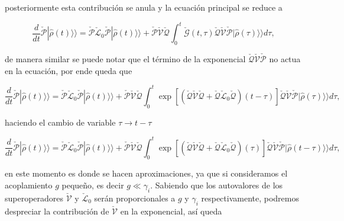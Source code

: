 \begin{appendixs}
posteriormente esta contribución se anula y la ecuación principal se reduce a

\begin{equation*}
    \frac{d}{dt}\check{\mathcal{P}}|\hat{\rho}(t)\rangle \rangle = \check{\mathcal{P}}\check{\mathcal{L}}_{0}\check{\mathcal{P}}|\hat{\rho}(t)\rangle \rangle + \check{\mathcal{P}}\check{\mathcal{V}}\check{\mathcal{Q}}\int_{0}^{t}\check{\mathcal{G}}(t,\tau)\check{\mathcal{Q}}\check{\mathcal{V}} \check{\mathcal{P}}|\hat{\rho}(\tau)\rangle \rangle d\tau,        
\end{equation*}

de manera similar se puede notar que el término de la exponencial $\check{\mathcal{Q}}\check{\mathcal{V}}\check{\mathcal{P}}$ no actua en la ecuación, por ende queda que 

\begin{equation*}
    \frac{d}{dt}\check{\mathcal{P}}|\hat{\rho}(t)\rangle \rangle  = \check{\mathcal{P}}\check{\mathcal{L}}_{0}\check{\mathcal{P}}|\hat{\rho}(t)\rangle \rangle  + \check{\mathcal{P}}\check{\mathcal{V}}\check{\mathcal{Q}}\int_{0}^{t}\exp \left[\left(\check{\mathcal{Q}}\check{\mathcal{V}}\check{\mathcal{Q}} + \check{\mathcal{Q}}\check{\mathcal{L}}_{0}\check{\mathcal{Q}}\right) (t-\tau) \right]\check{\mathcal{Q}}\check{\mathcal{V}} \check{\mathcal{P}}|\hat{\rho}(\tau)\rangle \rangle d\tau,        
\end{equation*}

haciendo el cambio de variable $\tau \to t-\tau$

\begin{equation*}
    \frac{d}{dt}\check{\mathcal{P}}|\hat{\rho}(t)\rangle \rangle = \check{\mathcal{P}}\check{\mathcal{L}}_{0}\check{\mathcal{P}}|\hat{\rho}(t)\rangle \rangle  + \check{\mathcal{P}}\check{\mathcal{V}}\check{\mathcal{Q}}\int_{0}^{t}\exp \left[\left(\check{\mathcal{Q}}\check{\mathcal{V}}\check{\mathcal{Q}} + \check{\mathcal{Q}}\check{\mathcal{L}}_{0}\check{\mathcal{Q}}\right) (\tau) \right]\check{\mathcal{Q}}\check{\mathcal{V}} \check{\mathcal{P}}|\hat{\rho}(t-\tau)\rangle \rangle d\tau,        
\end{equation*}

en este momento es donde se hacen aproximaciones, ya que si consideramos el acoplamiento $g$ pequeño, es decir $g \ll \gamma_{i}$. Sabiendo que los autovalores de los superoperadores $\check{\mathcal{V}}$ y $\check{\mathcal{L}}_{0}$ serán proporcionales a $g$ y $\gamma_{i}$ respectivamente,  podremos despreciar la contribución de $\check{\mathcal{V}}$ en la exponencial, así queda


\end{appendixs}
